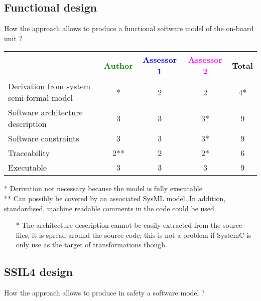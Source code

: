 \subsection{Functional design}

How the approach allows to produce a functional software model of the on-board unit ?

\begin{tabular}{|l | c | c | c | c|}
\hline
& \textcolor{green}{Author} & \textcolor{blue}{Assessor 1} & \textcolor{magenta}{Assessor 2} & Total \\
\hline
Derivation from system semi-formal model &* &2 &2 & 4* \\
\hline
Software architecture description &3 &3 &3* & 9 \\
\hline
Software constraints &3 &3 &3* & 9 \\
\hline
Traceability &2** &2 &2* & 6 \\
\hline
Executable &3 &3 &3 & 9 \\
\hline
\end{tabular}

\begin{author_comment}
* Derivation not necessary because the model is fully executable\\
** Can possibly be covered by an associated SysML model. In addition, standardised, machine readable comments in the code could be used.\\
\end{author_comment}

\begin{assessor2}
  \begin{itemize}
  \item[*] The architecture description cannot be easily extracted
    from the source files, it is spread around the source code; this
    is not a problem if SystemC is only use as the target of
    transformations though.
  \end{itemize}  
\end{assessor2}


\subsection{SSIL4 design}

How the approach allows to produce in safety a software model ?

